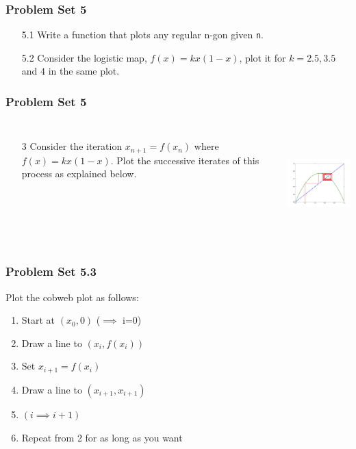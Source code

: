 \documentclass[14pt,compress]{beamer}
\newcounter{time}
\newcommand{\inctime}[1]{\addtocounter{time}{#1}{\tiny \thetime\ m}}
\newcommand{\typ}[1]{\texttt{#1}}
\begin{document}
\begin{frame}
  \frametitle{Problem Set 5}
  \begin{itemize}
      \item[5.1] Write a function that plots any regular n-gon given \typ{n}.
      \item[5.2] Consider the logistic map, $f(x) = kx(1-x)$, plot it for
          $k=2.5, 3.5$ and $4$ in the same plot.
\end{itemize}
\end{frame}

\begin{frame}[fragile] 
\frametitle{Problem Set 5}
  \begin{columns}
    \small{
    \begin{itemize}
      \item[3] Consider the iteration $x_{n+1} = f(x_n)$ where $f(x) = kx(1-x)$.  Plot the successive iterates of this process as explained below. 
    \end{itemize}}
    \hspace*{-0.5in}
  \includegraphics[height=1.6in, interpolate=true]{data/cobweb}  
\end{columns}
\end{frame}

\begin{frame}
  \frametitle{Problem Set 5.3}
  Plot the cobweb plot as follows:
  \begin{enumerate}
    \item Start at $(x_0, 0)$ ($\implies$ i=0)
    \item Draw a line to $(x_i, f(x_i))$
    \item Set $x_{i+1} = f(x_i)$
    \item Draw a line to $(x_{i+1}, x_{i+1})$
    \item $(i\implies i+1)$ 
    \item Repeat from 2 for as long as you want 
  \end{enumerate}
\inctime{20}
\end{frame}
\end{document}
